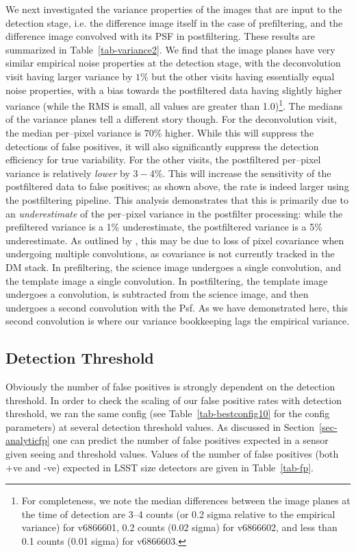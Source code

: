 \documentclass[prd, nofootinbib, floatfix, 11pt,tightenlines,times]{article}
\begin{document}
We next investigated the variance properties of the images that are
input to the detection stage, i.e. the difference image itself in the
case of prefiltering, and the difference image convolved with its PSF
in postfiltering.  These results are summarized in
Table~\ref{tab-variance2}.  We find that the image planes have very
similar empirical noise properties at the detection stage, with the
deconvolution visit having larger variance by $1\%$ but the other
visits having essentially equal noise properties, with a bias towards
the postfiltered data having slightly higher variance (while the RMS
is small, all values are greater than 1.0)\footnote{For completeness,
  we note the median differences between the image planes at the time
  of detection are 3--4 counts (or 0.2 sigma relative to the empirical
  variance) for v6866601, 0.2 counts (0.02 sigma) for v6866602, and
  less than 0.1 counts (0.01 sigma) for v6866603.}.  The medians of
the variance planes tell a different story though.  For the
deconvolution visit, the median per--pixel variance is $70\%$ higher.
While this will suppress the detections of false positives, it will
also significantly suppress the detection efficiency for true
variability.  For the other visits, the postfiltered per--pixel
variance is relatively {\it lower} by $3-4\%$.  This will increase
the sensitivity of the postfiltered data to false positives; as shown
above, the rate is indeed larger using the postfiltering pipeline.
This analysis demonstrates that this is primarily due to an {\it
  underestimate} of the per--pixel variance in the postfilter
processing: while the prefiltered variance is a 1\% underestimate, the
postfiltered variance is a 5\% underestimate.  As outlined by
\cite{Price-Stacking}, this may be due to loss of pixel covariance
when undergoing multiple convolutions, as covariance is not currently
tracked in the DM stack.  In prefiltering, the science image undergoes
a single convolution, and the template image a single convolution.  In
postfiltering, the template image undergoes a convolution, is
subtracted from the science image, and then undergoes a second
convolution with the Psf.  As we have demonstrated here, this second
convolution is where our variance bookkeeping lags the empirical
variance.

\subsection{Detection Threshold \label{sec-thresh}}
Obviously the number of false positives is strongly dependent on the detection threshold.  In order to
check the scaling of our false positive rates with detection threshold, we ran the same config (see Table~\ref{tab-bestconfig10} 
for the config parameters)
at several detection threshold values.  As discussed in 
Section~\ref{sec-analyticfp} one can predict the number of false positives expected in a sensor given
seeing and threshold values.  Values of the number of false positives (both +ve and -ve)
expected in LSST size detectors are given in Table~\ref{tab-fp}.  
\end{document}
